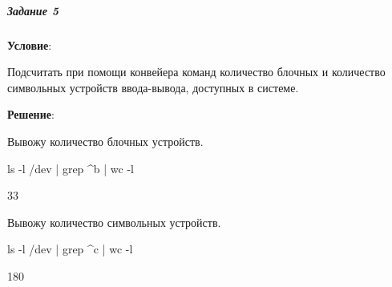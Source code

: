 \subparagraph{Задание 5} \textbf{Условие}:

Подсчитать при помощи конвейера команд количество блочных и количество символьных устройств ввода-вывода, доступных в системе.

\textbf{Решение}:

Вывожу количество блочных устройств.

\begin{BashBox}
ls -l /dev | grep ^b | wc -l
\end{BashBox}

\begin{OutBox}
33
\end{OutBox}

Вывожу количество символьных устройств.

\begin{BashBox}
ls -l /dev | grep ^c | wc -l
\end{BashBox}

\begin{OutBox}
180
\end{OutBox}
